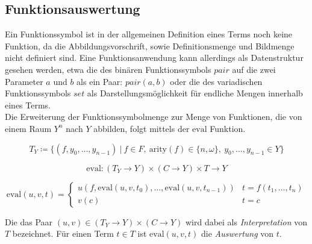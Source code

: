 \documentclass{article}
\begin{document}
\subsection{Funktionsauswertung}
Ein Funktionssymbol ist in der allgemeinen Definition eines Terms noch keine Funktion, da die Abbildungsvorschrift, sowie Definitionsmenge und Bildmenge nicht definiert sind. Eine Funktionsanwendung kann allerdings als Datenstruktur gesehen werden, etwa die des binären Funktionssymbols $pair$ auf die zwei Parameter $a$ und $b$ als ein Paar: $pair(a, b)$ oder die des variadischen Funktionssymbols $set$ als Darstellungsmöglichkeit für endliche Mengen innerhalb eines Terms.\\
Die Erweiterung der Funktionssymbolmenge zur Menge von Funktionen, die von einem Raum $Y^n$ nach $Y$ abbilden, folgt mittels der $\mathrm{eval}$ Funktion.

$$T_Y \coloneqq \{(f, y_0, \dots, y_{n-1})~|~f \in F,~\mathrm{arity}(f) \in \{n, \omega\},
~ y_0, \dots,y_{n-1} \in Y\}$$

$$\mathrm{eval} \colon (T_Y \rightarrow Y) \times (C \rightarrow Y) \times T \rightarrow Y$$

$$\mathrm{eval}(u, v, t) = \begin{cases}
	u(f, \mathrm{eval}(u, v, t_0), \dots, \mathrm{eval}(u, v, t_{n-1})) & t = f(t_1, \dots, t_n)\\
	v(c)                                                                                               & t = c
\end{cases}$$

Die das Paar $(u, v) \in (T_Y \rightarrow Y) \times (C \rightarrow Y)$ wird dabei als \textit{Interpretation} von $T$ bezeichnet. Für einen Term $t \in T$ ist $\mathrm{eval}(u, v, t)$ die \textit{Auswertung} von $t$.
\\~\\
\end{document}
